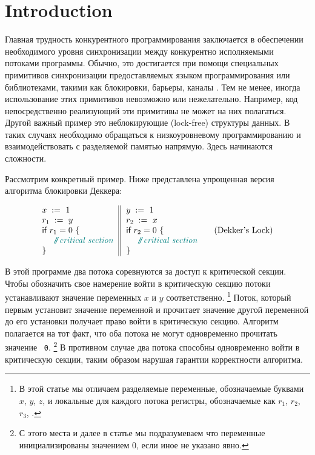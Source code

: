 \section{Introduction}
\label{sec:intro}

Главная трудность конкурентного программирования 
заключается в обеспечении необходимого уровня 
синхронизации между конкурентно исполняемыми потоками программы. 
Обычно, это достигается при помощи специальных 
примитивов синхронизации предоставляемых 
языком программирования или библиотеками, 
такими как блокировки, барьеры, каналы \etc. 
Тем не менее, иногда использование этих примитивов 
невозможно или нежелательно. 
Например, код непосредственно реализующий эти 
примитивы не может на них полагаться. 
Другой важный пример это неблокирующие (lock-free) структуры данных.
В таких случаях необходимо обращаться к 
низкоуровневому программированию и 
взаимодействовать с разделяемой памятью напрямую.
Здесь начинаются сложности. 

Рассмотрим конкретный пример.
Ниже представлена упрощенная версия 
алгоритма блокировки Деккера:

\begin{equation*}
\inarrII{
  \writeInst{}{x}{1} \\
  \readInst{}{r_1}{y}  \\
  \kw{if} {r_1 = 0} ~\{ \\
  ~~ \comment{critical section} \\
  \}
}{
  \writeInst{}{y}{1} \\
  \readInst{}{r_2}{x}  \\
  \kw{if} {r_2 = 0} ~\{ \\
  ~~ \comment{critical section} \\
  \}
}
\tag{Dekker's Lock}\label{ex:Dekker}
\end{equation*}

В этой программе два потока соревнуются за доступ к критической секции.
Чтобы обозначить свое намерение войти в критическую секцию
потоки устанавливают значение переменных $x$ и $y$ соответственно.%
\footnote{В этой статье мы отличаем разделяемые переменные,
обозначаемые буквами $x$, $y$, $z$, и 
локальные для каждого потока регистры, 
обозначаемые как $r_1$, $r_2$, $r_3$, \etc.}
Поток, который первым установит значение переменной и 
прочитает значение другой переменной до его установки
получает право войти в критическую секцию.
Алгоритм полагается на тот факт, что оба 
потока не могут одновременно прочитать значение ~\texttt{0}.%
\footnote{С этого места и далее в статье мы подразумеваем 
что переменные инициализированы значением 0, если иное не указано явно.}
В противном случае два потока способны одновременно 
войти в критическую секции, таким образом нарушая 
гарантии корректности алгоритма. 

